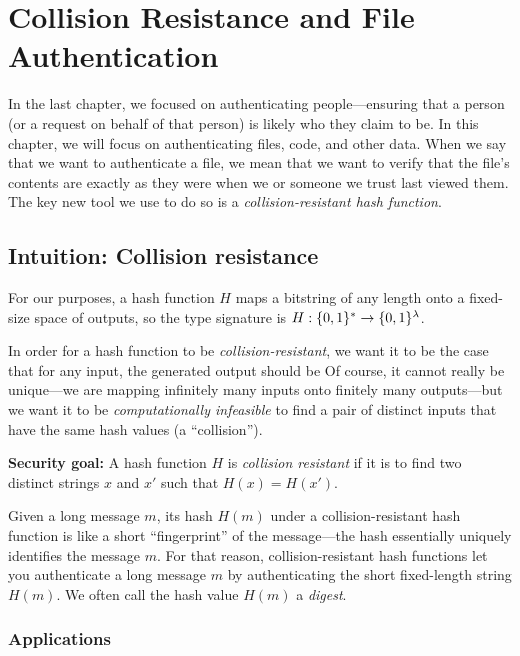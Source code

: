 \chapter{Collision Resistance and File Authentication}

In the last chapter, we focused on authenticating people---ensuring that
a person (or a request on behalf of that person) is likely who they claim to be.
In this chapter, we will focus on authenticating
files, code, and other data.
When we say that we want to authenticate a file,
we mean that we want to verify that the file's
contents are exactly as they were when we or
someone we trust last viewed them.
The key new tool we use to do so is a \textit{collision-resistant hash function}. 

\section{Intuition: Collision resistance}
For our purposes, a hash function $H$ 
maps a bitstring of any length onto a fixed-size space of outputs,
so the type signature is $H: \{0,1\}^* \rightarrow \{0,1\}^{\lambda}$.

In order for a hash function to be \textit{collision-resistant}, we want it to be the case that for any input, the generated output should be  Of course, it cannot really be unique---we are mapping infinitely many inputs onto finitely many outputs---but we want it to be \textit{computationally infeasible} to find a 
pair of distinct inputs that have the same hash values (a ``collision'').

\begin{framed}
\noindent
\textbf{Security goal:} A hash function $H$ is \emph{collision resistant} if
it is  to find two distinct strings
$x$ and $x'$ such that $H(x) = H(x')$.
\end{framed}

Given a long message $m$, its hash $H(m)$ under a collision-resistant
hash function is like a short ``fingerprint'' of the message---the
hash essentially uniquely identifies the message $m$.
For that reason, collision-resistant hash functions let you authenticate 
a long message $m$ by authenticating the  short fixed-length string $H(m)$.
We often call the hash value $H(m)$ a \emph{digest}.

\subsection{Applications}
